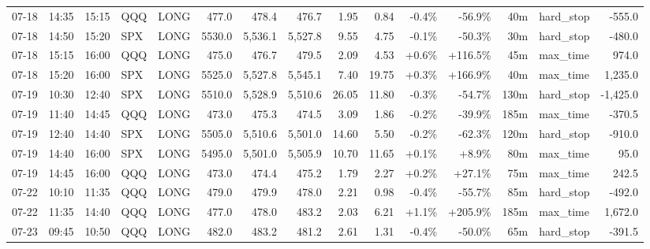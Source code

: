 \documentclass[11pt,a4paper,twoside]{article}
\begin{document}
\begin{landscape}
\begin{center}
\begin{longtable}{>{\color{txtmain}}l l l l l r r r r r r r r >{\color{txtmain}}l r}
07-18 & 14:35 & 15:15 & QQQ & LONG & 477.0 & 478.4 & 476.7 & 1.95 & 0.84 & \textcolor{lossred}{-0.4\%} & \textcolor{lossred}{-56.9\%} & 40m & hard\_stop & \textcolor{lossred}{-555.0} \\
07-18 & 14:50 & 15:20 & SPX & LONG & 5530.0 & 5,536.1 & 5,527.8 & 9.55 & 4.75 & \textcolor{lossred}{-0.1\%} & \textcolor{lossred}{-50.3\%} & 30m & hard\_stop & \textcolor{lossred}{-480.0} \\
07-18 & 15:15 & 16:00 & QQQ & LONG & 475.0 & 476.7 & 479.5 & 2.09 & 4.53 & \textcolor{wingreen}{+0.6\%} & \textcolor{wingreen}{+116.5\%} & 45m & max\_time & \textcolor{wingreen}{974.0} \\
07-18 & 15:20 & 16:00 & SPX & LONG & 5525.0 & 5,527.8 & 5,545.1 & 7.40 & 19.75 & \textcolor{wingreen}{+0.3\%} & \textcolor{wingreen}{+166.9\%} & 40m & max\_time & \textcolor{wingreen}{1,235.0} \\
07-19 & 10:30 & 12:40 & SPX & LONG & 5510.0 & 5,528.9 & 5,510.6 & 26.05 & 11.80 & \textcolor{lossred}{-0.3\%} & \textcolor{lossred}{-54.7\%} & 130m & hard\_stop & \textcolor{lossred}{-1,425.0} \\
07-19 & 11:40 & 14:45 & QQQ & LONG & 473.0 & 475.3 & 474.5 & 3.09 & 1.86 & \textcolor{lossred}{-0.2\%} & \textcolor{lossred}{-39.9\%} & 185m & max\_time & \textcolor{lossred}{-370.5} \\
07-19 & 12:40 & 14:40 & SPX & LONG & 5505.0 & 5,510.6 & 5,501.0 & 14.60 & 5.50 & \textcolor{lossred}{-0.2\%} & \textcolor{lossred}{-62.3\%} & 120m & hard\_stop & \textcolor{lossred}{-910.0} \\
07-19 & 14:40 & 16:00 & SPX & LONG & 5495.0 & 5,501.0 & 5,505.9 & 10.70 & 11.65 & \textcolor{wingreen}{+0.1\%} & \textcolor{wingreen}{+8.9\%} & 80m & max\_time & \textcolor{wingreen}{95.0} \\
07-19 & 14:45 & 16:00 & QQQ & LONG & 473.0 & 474.4 & 475.2 & 1.79 & 2.27 & \textcolor{wingreen}{+0.2\%} & \textcolor{wingreen}{+27.1\%} & 75m & max\_time & \textcolor{wingreen}{242.5} \\
07-22 & 10:10 & 11:35 & QQQ & LONG & 479.0 & 479.9 & 478.0 & 2.21 & 0.98 & \textcolor{lossred}{-0.4\%} & \textcolor{lossred}{-55.7\%} & 85m & hard\_stop & \textcolor{lossred}{-492.0} \\
07-22 & 11:35 & 14:40 & QQQ & LONG & 477.0 & 478.0 & 483.2 & 2.03 & 6.21 & \textcolor{wingreen}{+1.1\%} & \textcolor{wingreen}{+205.9\%} & 185m & max\_time & \textcolor{wingreen}{1,672.0} \\
07-23 & 09:45 & 10:50 & QQQ & LONG & 482.0 & 483.2 & 481.2 & 2.61 & 1.31 & \textcolor{lossred}{-0.4\%} & \textcolor{lossred}{-50.0\%} & 65m & hard\_stop & \textcolor{lossred}{-391.5} \\

\end{longtable}
\end{center}
\end{landscape}
\end{document}
